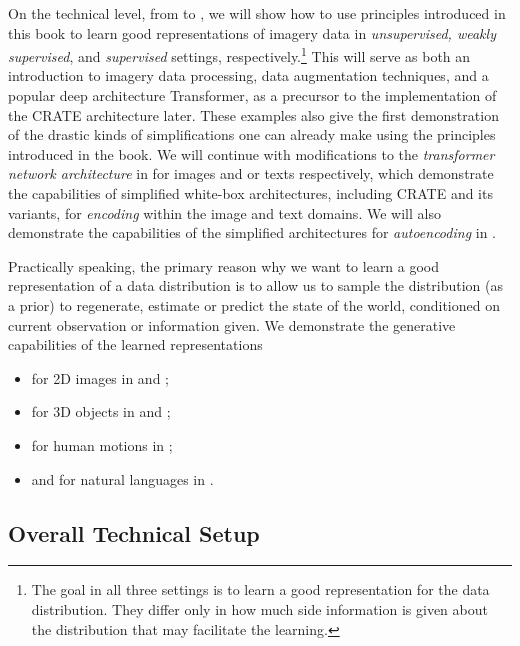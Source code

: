 \documentclass[../../book-main.tex]{subfiles}
\begin{document}
On the technical level, from   to
, we will show how to use principles
introduced in this book to learn good representations of imagery data
in {\em unsupervised, weakly supervised}, and {\em supervised}
settings, respectively.\footnote{The goal in all three settings is to
    learn a good representation for the data distribution. They differ
    only in how much side information is given about the distribution
that may facilitate the learning.} This will serve as both an
introduction to imagery data processing, data augmentation
techniques, and a popular deep architecture Transformer, as a
precursor to the implementation of the CRATE architecture later.
These examples also give the
first demonstration of the drastic kinds of simplifications one can
already make using the principles introduced in the book. We will continue
with modifications to the \textit{transformer network architecture}
in  for images and 
or texts respectively, which demonstrate the capabilities of
simplified white-box architectures, including CRATE and its variants,
for \textit{encoding} within the
image and text domains. We will also demonstrate the capabilities of
the simplified architectures for \textit{autoencoding} in
. %

Practically speaking, the primary reason why we want to learn a good
representation of a data distribution is to allow us to sample the
distribution (as a prior) to regenerate, estimate or predict the
state of the world, conditioned on current observation or information
given. We demonstrate the generative capabilities of the learned representations
\begin{itemize}
    \item for 2D images in  and
        ;
    \item for 3D objects in
         and ;
    \item for human motions in ;
    \item and for natural languages in .
\end{itemize}

\subsection{Overall Technical Setup}\label{sec:experiment_setup}
\end{document}
